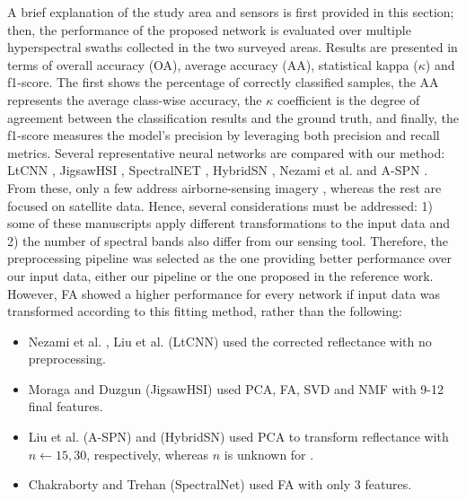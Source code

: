 A brief explanation of the study area and sensors is first provided in this section; then, the performance of the proposed network is evaluated over multiple hyperspectral swaths collected in the two surveyed areas. Results are presented in terms of overall accuracy (OA), average accuracy (AA), statistical kappa ($\kappa$) and f1-score. The first shows the percentage of correctly classified samples, the AA represents the average class-wise accuracy, the $\kappa$ coefficient is the degree of agreement between the classification results and the ground truth, and finally, the f1-score measures the model's precision by leveraging both precision and recall metrics. Several representative neural networks are compared with our method: LtCNN \cite{liu_plant_2022}, JigsawHSI \cite{moraga_jigsawhsi_2022}, SpectralNET \cite{chakraborty_spectralnet_2021}, HybridSN \cite{roy_hybridsn_2020}, Nezami et al. \cite{nezami_tree_2020} and A-SPN \cite{xue_attention-based_2021}. From these, only a few address airborne-sensing imagery \cite{liu_plant_2022}, whereas the rest are focused on satellite data. Hence, several considerations must be addressed: 1) some of these manuscripts apply different transformations to the input data and 2) the number of spectral bands also differ from our sensing tool. Therefore, the preprocessing pipeline was selected as the one providing better performance over our input data, either our pipeline or the one proposed in the reference work. However, FA showed a higher performance for every network if input data was transformed according to this fitting method, rather than the following: 
\begin{itemize}
    \item Nezami et al. \cite{nezami_tree_2020}, Liu et al. \cite{liu_plant_2022} (LtCNN) used the corrected reflectance with no preprocessing. 
    \item Moraga and Duzgun \cite{moraga_jigsawhsi_2022} (JigsawHSI) used PCA, FA, SVD and NMF with 9-12 final features.
    \item Liu et al. \cite{liu_plant_2022} (A-SPN) and \cite{roy_hybridsn_2020} (HybridSN) used PCA to transform reflectance with $n \gets 15, 30$, respectively, whereas $n$ is unknown for \cite{xue_attention-based_2021}.
    \item Chakraborty and Trehan \cite{chakraborty_spectralnet_2021} (SpectralNet) used FA with only 3 features.
\end{itemize}

